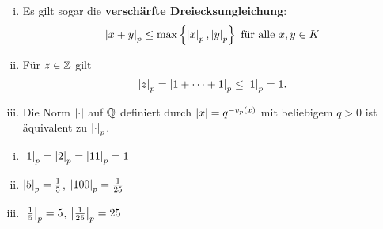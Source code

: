 \begin{Bem}
\begin{enumerate}[(i)]
\item Es gilt sogar die \textbf{verschärfte Dreiecksungleichung}:
\[ \left|{x+y}\right|_p \leq \max\left\{ \left|{x}\right|_p, \left|{y}\right|_p \right\}
\text{ für alle } x,y \in K
\]
\item Für $z \in \mathbb{Z}$ gilt 
\[ \left|{z}\right|_p = \left|{ 1+ \cdots +1}\right|_p \leq \left|{1}\right|_p = 1.
\]
\item Die Norm $\left|{\cdot}\right|$ auf $\mathbb{Q}$ definiert durch $\left|{x}\right| = q^{-v_p(x)}$ mit beliebigem $q>0$ ist äquivalent zu $\left|{\cdot}\right|_p$.
\end{enumerate}
\end{Bem}

\begin{Bsp}
\begin{enumerate}[(i)]
\item $\left|{1}\right|_p = \left|{2}\right|_p  = \left|{11}\right|_p =1$
\item $\left|{5}\right|_p = \frac{1}{5}$, $\left|{100}\right|_p = \frac{1}{25}$
\item $\left|{\frac{1}{5}}\right|_p = 5$, $\left|{\frac{1}{25}}\right|_p = 25$
\end{enumerate}	
\end{Bsp}



